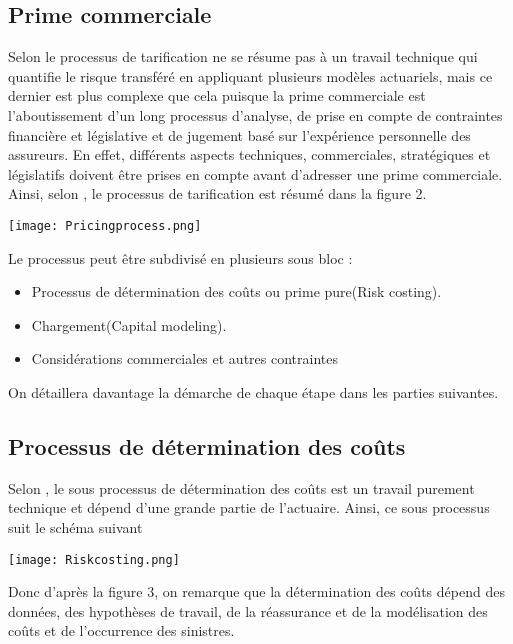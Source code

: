 \documentclass[11pt]{article}
\begin{document}
\subsection{Prime commerciale}

Selon \cite{parodi2014pricing} le processus de tarification ne se résume pas à un travail technique qui quantifie le risque transféré en appliquant plusieurs modèles actuariels, mais ce dernier est plus complexe que cela puisque la prime commerciale est l'aboutissement d'un long processus d'analyse, de prise en compte de contraintes financière et législative et de jugement basé sur l'expérience personnelle des assureurs. En effet, différents aspects techniques, commerciales, stratégiques et législatifs doivent être prises en compte avant d’adresser une prime commerciale.\\
Ainsi, selon \cite{parodi2014pricing}, le processus de tarification est résumé dans la figure 2.
\begin{center}
\texttt{[image: Pricingprocess.png]}
\end{center}

Le processus peut être subdivisé en plusieurs sous bloc :
\begin{itemize}
\item Processus de détermination des coûts ou prime pure(Risk costing).
\item Chargement(Capital modeling).
\item Considérations commerciales et autres contraintes
\end{itemize}
On détaillera davantage la démarche de chaque étape dans les parties suivantes.\\
\subsection{Processus de détermination des coûts}
Selon \cite{parodi2014pricing}, le sous processus de détermination des coûts est un travail purement technique et dépend d'une grande partie de l'actuaire. Ainsi, ce sous processus suit le schéma suivant
\begin{center}
\texttt{[image: Riskcosting.png]}
\end{center}

Donc d'après la figure 3, on remarque que la détermination des coûts dépend des données, des hypothèses de travail, de la réassurance et de la modélisation des coûts et de l'occurrence des sinistres.\\
\end{document}
